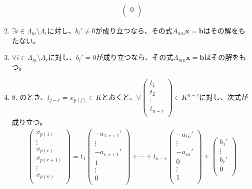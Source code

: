 \documentclass[dvipdfmx]{jsarticle}
\begin{document}
\begin{thm}
\begin{enumerate}
\begin{align*}
\begin{pmatrix}
0 \\
\end{pmatrix}
\end{align*}
\item
  $\exists i \in \varLambda_{m} \setminus \varLambda_{r}$に対し、$b_{i}' \neq 0$が成り立つなら、その式$A_{mn}\mathbf{x} = \mathbf{b}$はその解をもたない。
\item
  $\forall i \in \varLambda_{m} \setminus \varLambda_{r}$に対し、$b_{i}' = 0$が成り立つなら、その式$A_{mn}\mathbf{x} = \mathbf{b}$はその解をもつ。
\item
  8. のとき、$t_{j - r} = x_{p(j)} \in K$とおくと、$\forall\begin{pmatrix}
  t_{1} \\
  t_{2} \\
   \vdots \\
  t_{n - r} \\
  \end{pmatrix} \in K^{n - r}$に対し、次式が成り立つ。
\begin{align*}
\begin{pmatrix}
x_{p(1)} \\
 \vdots \\
x_{p(r)} \\
x_{p(r + 1)} \\
 \vdots \\
x_{p(n)} \\
\end{pmatrix} = t_{1}\begin{pmatrix}
 - a_{1,r + 1}' \\
 \vdots \\
 - a_{r,r + 1}' \\
1 \\
 \vdots \\
0 \\
\end{pmatrix} + \cdots + t_{n - r}\begin{pmatrix}
 - a_{1n}' \\
 \vdots \\
 - a_{rn}' \\
0 \\
 \vdots \\
1 \\
\end{pmatrix} + \begin{pmatrix}
b_{1}' \\
 \vdots \\
b_{r}' \\
0 \\

\end{pmatrix}
\end{align*}
\end{enumerate}
\end{thm}
\end{document}
